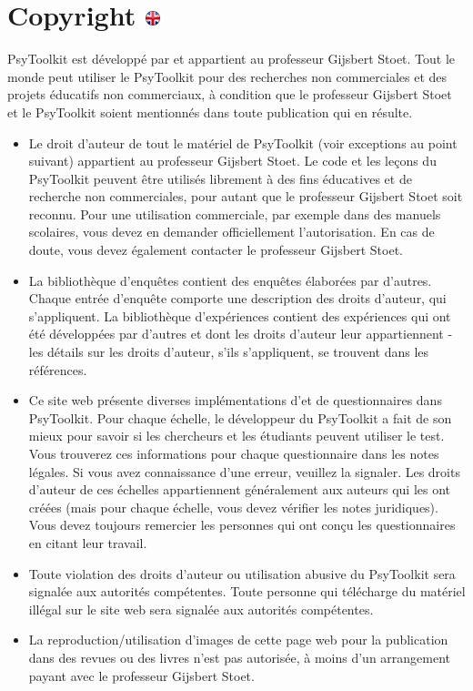 \documentclass[
]{book}
\providecommand{\tightlist}{%
  \setlength{\itemsep}{0pt}\setlength{\parskip}{0pt}}
\begin{document}
\hypertarget{copyright}{%
\section[Copyright ]{\texorpdfstring{Copyright \href{https://www.psytoolkit.org/copyright.html}{\protect\includegraphics{img/ukflag.png}}}{Copyright }}\label{copyright}}

PsyToolkit est développé par et appartient au professeur Gijsbert Stoet. Tout le monde peut utiliser le PsyToolkit pour des recherches non commerciales et des projets éducatifs non commerciaux, à condition que le professeur Gijsbert Stoet et le PsyToolkit soient mentionnés dans toute publication qui en résulte.

\begin{itemize}
\tightlist
\item
  Le droit d'auteur de tout le matériel de PsyToolkit (voir exceptions au point suivant) appartient au professeur Gijsbert Stoet. Le code et les leçons du PsyToolkit peuvent être utilisés librement à des fins éducatives et de recherche non commerciales, pour autant que le professeur Gijsbert Stoet soit reconnu. Pour une utilisation commerciale, par exemple dans des manuels scolaires, vous devez en demander officiellement l'autorisation. En cas de doute, vous devez également contacter le professeur Gijsbert Stoet.
\item
  La bibliothèque d'enquêtes contient des enquêtes élaborées par d'autres. Chaque entrée d'enquête comporte une description des droits d'auteur, qui s'appliquent. La bibliothèque d'expériences contient des expériences qui ont été développées par d'autres et dont les droits d'auteur leur appartiennent - les détails sur les droits d'auteur, s'ils s'appliquent, se trouvent dans les références.
\item
  Ce site web présente diverses implémentations d'et de questionnaires dans PsyToolkit. Pour chaque échelle, le développeur du PsyToolkit a fait de son mieux pour savoir si les chercheurs et les étudiants peuvent utiliser le test. Vous trouverez ces informations pour chaque questionnaire dans les notes légales. Si vous avez connaissance d'une erreur, veuillez la signaler. Les droits d'auteur de ces échelles appartiennent généralement aux auteurs qui les ont créées (mais pour chaque échelle, vous devez vérifier les notes juridiques). Vous devez toujours remercier les personnes qui ont conçu les questionnaires en citant leur travail.
\item
  Toute violation des droits d'auteur ou utilisation abusive du PsyToolkit sera signalée aux autorités compétentes. Toute personne qui télécharge du matériel illégal sur le site web sera signalée aux autorités compétentes.
\item
  La reproduction/utilisation d'images de cette page web pour la publication dans des revues ou des livres n'est pas autorisée, à moins d'un arrangement payant avec le professeur Gijsbert Stoet.
\end{itemize}
\end{document}
